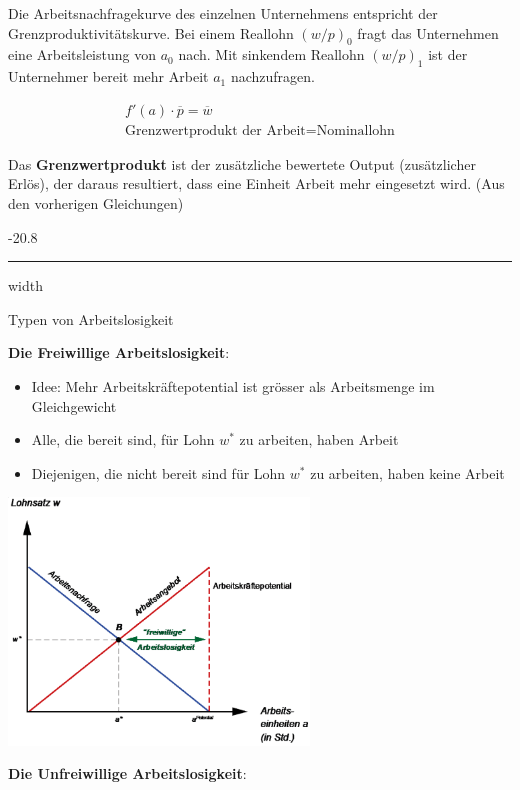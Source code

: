 \documentclass[9pt, landscape, fleqn]{scrartcl}
\makeatletter
\renewcommand{\subsubsection}{\@startsection{subsubsection}{1}{0mm}%
{-2\baselineskip}{0.8\baselineskip}%
{\hrule depth 0.2pt width\columnwidth\vspace*{1.2em}\normalsize\bfseries\rmfamily}}
\makeatother
\begin{document}
\begin{multicols*}{3}
Die Arbeitsnachfragekurve des einzelnen Unternehmens entspricht der Grenzproduktivitätskurve. Bei einem Reallohn $(w/p)_0$ fragt das Unternehmen eine Arbeitsleistung von $a_0$ nach. Mit sinkendem Reallohn $(w/p)_1$ ist der Unternehmer bereit mehr Arbeit $a_1$ nachzufragen.


\begin{align}
    f'(a)\cdot \overline{p} = \overline{w} \\
    \text{Grenzwertprodukt der Arbeit} = \text{Nominallohn}
\end{align}

Das \textbf{Grenzwertprodukt} ist der zusätzliche bewertete Output (zusätzlicher Erlös), der daraus resultiert, dass eine Einheit Arbeit mehr eingesetzt wird. (Aus den vorherigen Gleichungen)

\subsubsection{Typen von Arbeitslosigkeit}

\textbf{Die Freiwillige Arbeitslosigkeit}: 

\begin{itemize}
    \item Idee: Mehr Arbeitskräftepotential ist grösser als Arbeitsmenge im Gleichgewicht 
    \item Alle, die bereit sind, für Lohn $w^*$ zu arbeiten, haben Arbeit 
    \item Diejenigen, die nicht bereit sind für Lohn $w^*$ zu arbeiten, haben keine Arbeit 
\end{itemize}

\begin{center}
    \includegraphics[width=8cm]{Freiwillige_Arbeitslosigkeit.png}
\end{center}

\textbf{Die Unfreiwillige Arbeitslosigkeit}:


\end{multicols*}
\end{document}
